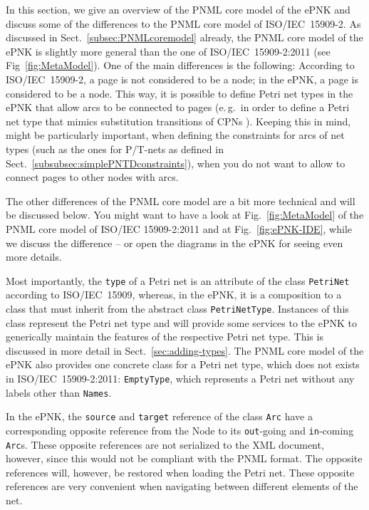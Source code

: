 In this section, we give an overview of the PNML core model of the
ePNK and discuss some of the differences to the PNML core model
of ISO/IEC~15909-2. As discussed in Sect.~\ref{subsec:PNMLcoremodel} already,
the PNML core model of the ePNK is slightly more general than the one of
ISO/IEC~15909-2:2011 \cite{ISO-IEC:15909-2-2011} (see Fig~\ref{fig:MetaModel}).
One of the main differences is the following: According to ISO/IEC~15909-2,
a page is not considered to be a node; in the ePNK, a page is considered to be
a node. This way, it is possible to define Petri net types in the ePNK that
allow arcs to be connected to pages (e.\,g.\ in order to define a Petri net
type that mimics substitution transitions of CPNs \cite{JeKr09}). Keeping
this in mind, might be particularly important, when defining the
constraints for arcs of net types (such as the ones for P/T-nets as
defined in Sect.~\ref{subsubsec:simplePNTDconstraints}), when you do
not want to allow to connect pages to other nodes with arcs.

The other differences of the PNML core model are a bit more technical
and will be discussed below. You might want to have a look at
Fig.~\ref{fig:MetaModel} of the PNML core model of ISO/IEC 15909-2:2011 
and at Fig.~\ref{fig:ePNK-IDE}, while we discuss the difference --
or open the diagrams in the ePNK for seeing even more details.

Most importantly, the {\tt type} of a Petri net  is an attribute
of the class {\tt PetriNet} according to ISO/IEC~15909, whereas, in the
ePNK, it is a composition to a class that must inherit from the abstract class
{\tt PetriNetType}.%
Instances of this class represent the Petri net type and will provide some
services to the ePNK to generically maintain the features of the respective
Petri net type. This is discussed in more detail in
Sect.~\ref{sec:adding-types}.
The PNML core model of the ePNK also provides one concrete class for a Petri net
type, which does not exists in ISO/IEC~15909-2:2011: {\tt EmptyType},%
which represents a Petri net without any labels other than {\tt Names}.

In the ePNK, the {\tt source} and {\tt target} reference of the class
{\tt Arc} have a corresponding opposite reference from the {\sf Node} to its
{\tt out}-going and {\tt in}-coming {\tt Arc}s. These opposite references
are not serialized to the XML document, however, since this would not be
compliant with the PNML format. The opposite references will, however,
be restored when loading the Petri net. These opposite references are very
convenient when navigating between different elements of the net.

